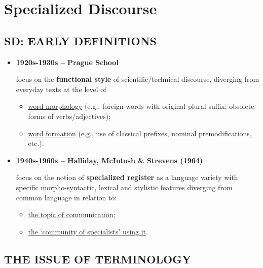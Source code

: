
\chapter{Specialized Discourse}
\label{cap:sd}

\section{SD: EARLY DEFINITIONS}

\begin{itemize}

\item\textbf{1920s-1930s – Prague School}

focus on the \textbf{functional style} of scientific/technical discourse, diverging from everyday texts at the level of 

\begin{itemize}

\item \underline{word morphology} (e.g., foreign words with original plural suffix; obsolete forms of verbs/adjectives); 
\item \underline{word formation} (e.g., use of classical prefixes, nominal premodifications, etc.).

\end{itemize}

\item\textbf{1940s-1960s – Halliday, McIntosh \& Strevens (1964)}

focus on the notion of \textbf{specialized register} as a language variety with specific morpho-syntactic, lexical and stylistic features diverging from common language in relation to:

\begin{itemize}

\item\underline{the topic of communication};
\item\underline{the ‘community of specialists’ using it}.

\end{itemize}

\end{itemize}


\section{THE ISSUE OF TERMINOLOGY}

